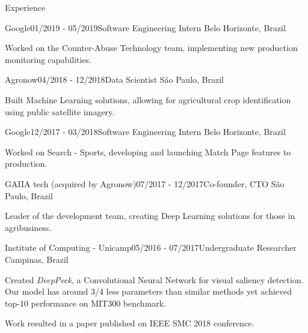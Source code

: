 \documentclass[8pt]{resume}
\newcommand{\tit}[1]{\textit{#1}}
\begin{document}
\begin{rSection}{Experience}

\begin{rSubsection}{Google}{01/2019 - 05/2019}{Software Engineering Intern}
    {Belo Horizonte, Brazil}
    \item Worked on the Counter-Abuse Technology team, implementing new production monitoring capabilities.
\end{rSubsection}

\begin{rSubsection}{Agronow}{04/2018 - 12/2018}{Data Scientist}
    {São Paulo, Brazil}
\item Built Machine Learning solutions, allowing for agricultural crop identification
        using public satellite imagery.
\end{rSubsection}

\begin{rSubsection}{Google}{12/2017 - 03/2018}{Software Engineering Intern}
    {Belo Horizonte, Brazil}
    \item Worked on Search - Sports, developing and launching Match Page features to production.
\end{rSubsection}

\begin{rSubsection}{GAIIA tech (acquired by Agronow)}{07/2017 - 12/2017}{Co-founder, CTO}
    {São Paulo, Brazil}
    \item Leader of the development team, creating Deep Learning solutions for those in agribusiness.
\end{rSubsection}

\begin{rSubsection}{Institute of Computing - Unicamp}{05/2016 - 07/2017}{Undergraduate Researcher}
    {Campinas, Brazil}
    \item Created \tit{DeepPeek}, a Convolutional Neural Network for visual saliency detection.
        Our model has around 3/4 less parameters than similar methods yet
        achieved top-10 performance on MIT300 benchmark.
    \item Work resulted in a paper published on IEEE SMC 2018 conference.
\end{rSubsection}


\end{rSection}
\end{document}
